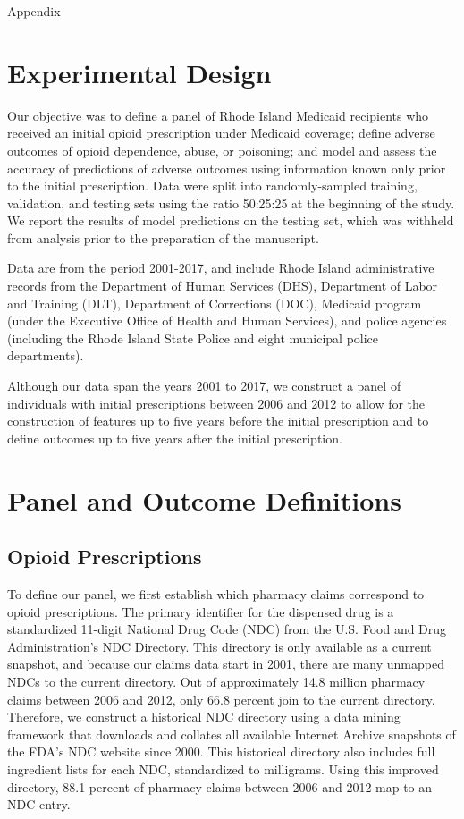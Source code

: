 \documentclass[11pt, letter]{article}
\begin{document}
\begin{center}
\huge Appendix
\end{center}

\section{Experimental Design}

Our objective was to define a panel of Rhode Island Medicaid recipients who received an initial opioid prescription under Medicaid coverage; define adverse outcomes of opioid dependence, abuse, or poisoning; and model and assess the accuracy of predictions of adverse outcomes using information known only prior to the initial prescription. Data were split into randomly-sampled training, validation, and testing sets using the ratio 50:25:25 at the beginning of the study. We report the results of model predictions on the testing set, which was withheld from analysis prior to the preparation of the manuscript.

Data are from the period 2001-2017, and include Rhode Island administrative records from the Department of Human Services (DHS), Department of Labor and Training (DLT), Department of Corrections (DOC), Medicaid program (under the Executive Office of Health and Human Services), and police agencies (including the Rhode Island State Police and eight municipal police departments).

Although our data span the years 2001 to 2017, we construct a panel of individuals with initial prescriptions between 2006 and 2012 to allow for the construction of features up to five years before the initial prescription and to define outcomes up to five years after the initial prescription.

\section{Panel and Outcome Definitions}

\subsection{Opioid Prescriptions}

To define our panel, we first establish which pharmacy claims correspond to opioid prescriptions. The primary identifier for the dispensed drug is a standardized 11-digit National Drug Code (NDC) from the U.S. Food and Drug Administration's NDC Directory. This directory is only available as a current snapshot, and because our claims data start in 2001, there are many unmapped NDCs to the current directory. Out of approximately 14.8 million pharmacy claims between 2006 and 2012, only 66.8 percent join to the current directory. Therefore, we construct a historical NDC directory using a data mining framework that downloads and collates all available Internet Archive snapshots of the FDA's NDC website since 2000. This historical directory also includes full ingredient lists for each NDC, standardized to milligrams. Using this improved directory, 88.1 percent of pharmacy claims between 2006 and 2012 map to an NDC entry. 
\end{document}
